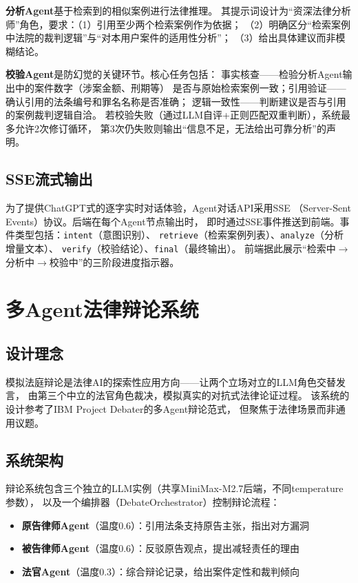 \documentclass[12pt,a4paper,twoside]{ctexart}
\begin{document}
\textbf{分析Agent}基于检索到的相似案例进行法律推理。
其提示词设计为``资深法律分析师''角色，要求：（1）引用至少两个检索案例作为依据；
（2）明确区分``检索案例中法院的裁判逻辑''与``对本用户案件的适用性分析''；
（3）给出具体建议而非模糊结论。

\textbf{校验Agent}是防幻觉的关键环节。核心任务包括：
事实核查——检验分析Agent输出中的案件数字（涉案金额、刑期等）
是否与原始检索案例一致；引用验证——确认引用的法条编号和罪名名称是否准确；
逻辑一致性——判断建议是否与引用的案例裁判逻辑自洽。
若校验失败（通过LLM自评+正则匹配双重判断），系统最多允许2次修订循环，
第3次仍失败则输出``信息不足，无法给出可靠分析''的声明。

\subsection{SSE流式输出}

为了提供ChatGPT式的逐字实时对话体验，Agent对话API采用SSE
（Server-Sent Events）协议\cite{langgraph}。后端在每个Agent节点输出时，
即时通过SSE事件推送到前端。事件类型包括：\texttt{intent}（意图识别）、
\texttt{retrieve}（检索案例列表）、\texttt{analyze}（分析增量文本）、
\texttt{verify}（校验结论）、\texttt{final}（最终输出）。
前端据此展示``检索中$\rightarrow$分析中$\rightarrow$校验中''的三阶段进度指示器。

\section{多Agent法律辩论系统}

\subsection{设计理念}

模拟法庭辩论是法律AI的探索性应用方向——让两个立场对立的LLM角色交替发言，
由第三个中立的法官角色裁决，模拟真实的对抗式法律论证过程。
该系统的设计参考了IBM Project Debater\cite{slonim2021}的多Agent辩论范式，
但聚焦于法律场景而非通用议题。

\subsection{系统架构}

辩论系统包含三个独立的LLM实例（共享MiniMax-M2.7后端，不同temperature参数），
以及一个编排器（DebateOrchestrator）控制辩论流程：

\begin{itemize}[leftmargin=*,itemsep=2pt]
    \item \textbf{原告律师Agent}（温度0.6）：引用法条支持原告主张，指出对方漏洞
    \item \textbf{被告律师Agent}（温度0.6）：反驳原告观点，提出减轻责任的理由
    \item \textbf{法官Agent}（温度0.3）：综合辩论记录，给出案件定性和裁判倾向
\end{itemize}
\end{document}
